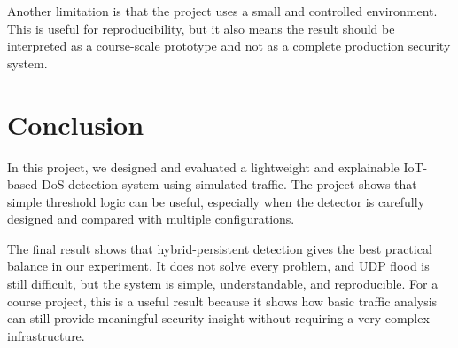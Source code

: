 \documentclass[11pt]{article}
\begin{document}
Another limitation is that the project uses a small and controlled environment. This is useful for
reproducibility, but it also means the result should be interpreted as a course-scale prototype
and not as a complete production security system.

\section*{Conclusion}
In this project, we designed and evaluated a lightweight and explainable IoT-based DoS detection
system using simulated traffic. The project shows that simple threshold logic can be useful,
especially when the detector is carefully designed and compared with multiple configurations.

The final result shows that hybrid-persistent detection gives the best practical balance in our
experiment. It does not solve every problem, and UDP flood is still difficult, but the system is
simple, understandable, and reproducible. For a course project, this is a useful result because it
shows how basic traffic analysis can still provide meaningful security insight without requiring a
very complex infrastructure.
\end{document}
